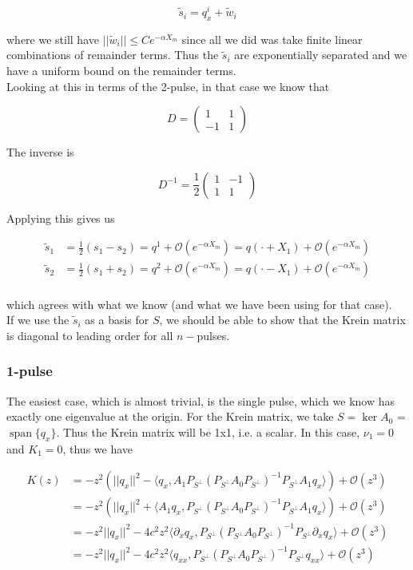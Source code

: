 \documentclass[12pt]{article}
\DeclareMathOperator{\spn}{span}
\begin{document}
\[
\tilde{s}_i = q^i_x + \tilde{w}_i
\]

where we still have $||\tilde{w}_i|| \leq C e^{-\alpha X_m}$ since all we did was take finite linear combinations of remainder terms. Thus the $\tilde{s}_i$ are exponentially separated and we have a uniform bound on the remainder terms.\\

Looking at this in terms of the 2-pulse, in that case we know that

\[
D = \begin{pmatrix} 1 & 1 \\ -1 & 1 \end{pmatrix}
\]

The inverse is

\[
D^{-1} = \frac{1}{2} \begin{pmatrix} 1 & -1 \\ 1 & 1 \end{pmatrix}
\]

Applying this gives us

\begin{align*}
\tilde{s}_1 &= \frac{1}{2}(s_1 - s_2) = q^1 + \mathcal{O}(e^{-\alpha X_m})
 = q(\cdot + X_1) + \mathcal{O}(e^{-\alpha X_m})\\
\tilde{s}_2 &= \frac{1}{2}(s_1 + s_2) = q^2 + \mathcal{O}(e^{-\alpha X_m})
 = q(\cdot - X_1) + \mathcal{O}(e^{-\alpha X_m}) \\
\end{align*}

which agrees with what we know (and what we have been using for that case).\\

If we use the $\tilde{s}_i$ as a basis for $S$, we should be able to show that the Krein matrix is diagonal to leading order for all $n-$pulses.

\subsubsection{1-pulse}

The easiest case, which is almost trivial, is the single pulse, which we know has exactly one eigenvalue at the origin. For the Krein matrix, we take $S = \ker A_0$ = $\spn \{q_x\}$. Thus the Krein matrix will be 1x1, i.e. a scalar. In this case, $\nu_1 = 0$ and $K_1 = 0$, thus we have

\begin{align*}
K(z) &= -z^2\left( ||q_x||^2 - \langle q_x, A_1 P_{S^\perp} (P_{S^\perp} A_0 P_{S^\perp})^{-1} P_{S^\perp} A_1 q_x \rangle \right) + \mathcal{O}(z^3) \\
&= -z^2\left( ||q_x||^2 + \langle A_1 q_x, P_{S^\perp} (P_{S^\perp} A_0 P_{S^\perp})^{-1} P_{S^\perp} A_1 q_x \rangle \right) + \mathcal{O}(z^3) \\
&= - z^2 ||q_x||^2 - 4 c^2 z^2 \langle \partial_x q_x, P_{S^\perp} (P_{S^\perp} A_0 P_{S^\perp})^{-1} P_{S^\perp} \partial_x q_x \rangle + \mathcal{O}(z^3) \\
&= - z^2 ||q_x||^2 - 4 c^2 z^2 \langle q_{xx}, P_{S^\perp} (P_{S^\perp} A_0 P_{S^\perp})^{-1} P_{S^\perp} q_{xx} \rangle + \mathcal{O}(z^3)
\end{align*}
\end{document}
